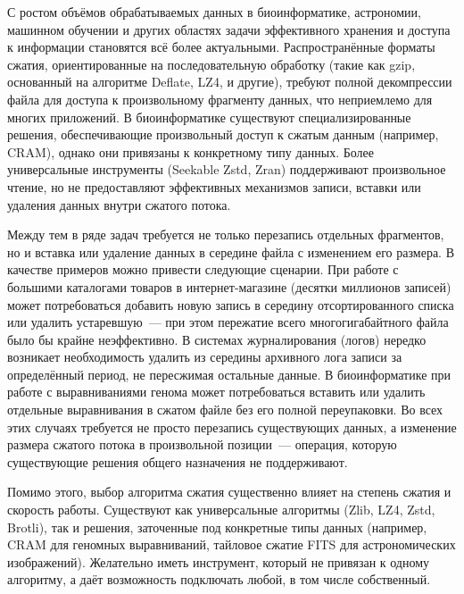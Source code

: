  \label{introduction}

С ростом объёмов обрабатываемых данных в биоинформатике, астрономии, машинном обучении и других областях задачи эффективного хранения и доступа к информации становятся всё более актуальными. Распространённые форматы сжатия, ориентированные на последовательную обработку (такие как gzip, основанный на алгоритме Deflate\cite{rfc1951_deflate}, LZ4\cite{lz4_github}, и другие), требуют полной декомпрессии файла для доступа к произвольному фрагменту данных, что неприемлемо для многих приложений. В биоинформатике существуют специализированные решения, обеспечивающие произвольный доступ к сжатым данным (например, CRAM\cite{fritz2011cram}), однако они привязаны к конкретному типу данных. Более универсальные инструменты (Seekable Zstd\cite{zstd_seekable}, Zran\cite{zran_example}) поддерживают произвольное чтение, но не предоставляют эффективных механизмов записи, вставки или удаления данных внутри сжатого потока.

Между тем в ряде задач требуется не только перезапись отдельных фрагментов, но и вставка или удаление данных в середине файла с изменением его размера. В качестве примеров можно привести следующие сценарии. При работе с большими каталогами товаров в интернет-магазине (десятки миллионов записей) может потребоваться добавить новую запись в середину отсортированного списка или удалить устаревшую~--- при этом пережатие всего многогигабайтного файла было бы крайне неэффективно. В системах журналирования (логов) нередко возникает необходимость удалить из середины архивного лога записи за определённый период, не пересжимая остальные данные. В биоинформатике при работе с выравниваниями генома может потребоваться вставить или удалить отдельные выравнивания в сжатом файле без его полной переупаковки. Во всех этих случаях требуется не просто перезапись существующих данных, а изменение размера сжатого потока в произвольной позиции~--- операция, которую существующие решения общего назначения не поддерживают.

Помимо этого, выбор алгоритма сжатия существенно влияет на степень сжатия и скорость работы. Существуют как универсальные алгоритмы (Zlib\cite{zlib_website}, LZ4\cite{lz4_github}, Zstd\cite{rfc8878_zstd}, Brotli\cite{rfc7932_brotli}), так и решения, заточенные под конкретные типы данных (например, CRAM\cite{fritz2011cram} для геномных выравниваний, тайловое сжатие FITS\cite{white2012tiledimageconventionstoring} для астрономических изображений). Желательно иметь инструмент, который не привязан к одному алгоритму, а даёт возможность подключать любой, в том числе собственный.

